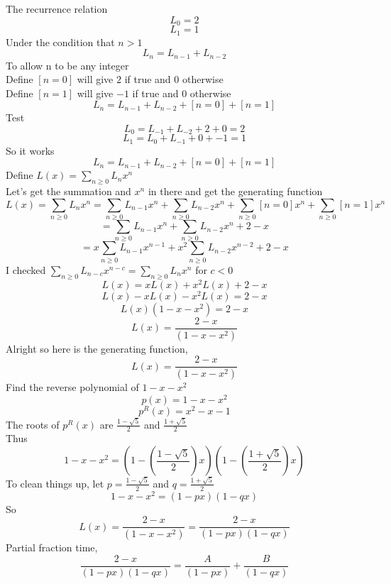 \documentclass[10pt, AMS Euler]{article}
\begin{document}
\begin{enumerate}
                The recurrence relation
                $$ L_0 = 2 $$
                $$ L_1 = 1 $$
                Under the condition that $n>1$
                $$ L_n = L_{n-1} + L_{n-2} $$
                To allow n to be any integer \\
                Define $[n=0]$ will give $2$ if true and $0$ otherwise \\
                Define $[n=1]$ will give $-1$ if true and $0$ otherwise \\
                $$ L_n = L_{n-1} + L_{n-2} + [n=0] + [n=1] $$
                Test
                $$ L_0 = L_{-1} + L_{-2} + 2 + 0 = 2 $$
                $$ L_1 = L_{0} + L_{-1} + 0 + -1 = 1 $$
                So it works
                $$ L_n = L_{n-1} + L_{n-2} + [n=0] + [n=1] $$
                Define $L(x) = \sum_{n\geq0} L_n x^n $ \\
                Let's get the summation and $x^n$ in there and get the generating function
                $$ L(x) = \sum_{n\geq0} L_n x^n = \sum_{n\geq0} L_{n-1} x^n + \sum_{n\geq0} L_{n-2} x^n + \sum_{n\geq0} [n=0] x^n + \sum_{n\geq0} [n=1] x^n $$
                $$ = \sum_{n\geq0} L_{n-1} x^n + \sum_{n\geq0} L_{n-2} x^n + 2 - x $$
                $$ = x \sum_{n\geq0} L_{n-1} x^{n-1} + x^2 \sum_{n\geq0} L_{n-2} x^{n-2} + 2 - x $$
                I checked $\sum_{n\geq0} L_{n-c} x^{n-c} = \sum_{n\geq0} L_n x^n $ for $c<0$ \\
                $$ L(x) = x L(x) + x^2 L(x) + 2 - x $$
                $$ L(x) - x L(x) - x^2 L(x) = 2 - x $$
                $$ L(x) ( 1 - x - x^2 ) = 2 - x $$
                $$ L(x) = \frac{2 - x}{( 1 - x - x^2 )} $$
                Alright so here is the generating function,
                $$ L(x) = \frac{2-x}{( 1 - x - x^2 )} $$
                Find the reverse polynomial of $ 1 - x - x^2 $
                $$ p(x) = 1 - x - x^2 $$
                $$ p^R(x) = x^2 - x - 1 $$
                The roots of $p^R(x)$ are $\frac{1-\sqrt{5}}{2}$ and $\frac{1+\sqrt{5}}{2}$ \\
                Thus \\
                $$ 1 - x - x^2 = (1-(\frac{1-\sqrt{5}}{2})x)(1-(\frac{1+\sqrt{5}}{2})x) $$
                To clean things up, let $p = \frac{1-\sqrt{5}}{2}$ and $q = \frac{1+\sqrt{5}}{2}$
                $$ 1 - x - x^2 = (1-px)(1-qx) $$
                So
                $$ L(x) = \frac{2-x}{( 1 - x - x^2 )}= \frac{2-x}{(1-px)(1-qx)}$$
                Partial fraction time,
                $$ \frac{2-x}{(1-px)(1-qx)} = \frac{A}{(1-px)} + \frac{B}{(1-qx)} $$

\end{enumerate}
\end{document}
